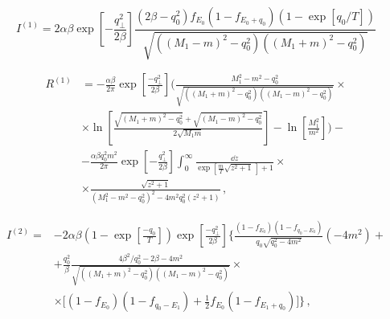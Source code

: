 \begin{equation}
I^{(1)}=2\alpha\beta\exp \left[-\frac{q_\perp^2}{2\beta }\right]\frac{\left(2\beta -q_0^2\right) f_{E_0}\left(1-f_{E_0+q_0}\right)\left(1-\exp[q_0/T]\right)}{ \sqrt{\left((M_1-m)^2-q_0^2\right) \left((M_1+m)^2-q_0^2\right)}}
\end{equation}

\begin{equation}\begin{aligned}
R^{(1)}&= -\frac{\alpha \beta}{2\pi}\exp\left[\frac{-q_\perp^2}{2\beta}\right]\bigg(\frac{M_1^2-m^2-q_0^2}{\sqrt{((M_1+m)^2-q_0^2)((M_1-m)^2-q_0^2)}}
\times
\\
&\times
\ln\left[\frac{\sqrt{(M_1+m)^2-q_0^2}+\sqrt{(M_1-m)^2-q_0^2}}{2\sqrt{M_1 m}}\right]-\ln\left[\frac{M_1^2}{m^2}\right]\bigg)
-
\\
&-\frac{\alpha \beta q_0^2 m^2}{2\pi} \exp\left[-\frac{q_\perp^2}{2\beta}\right]\int_{0}^{\infty}\frac{\dd z}{\exp \left[\frac{m}{T}\sqrt{z^2+1}\,\right]+1}\times
\\
&\times\frac{\sqrt{z^2+1}}{ \left(M_1^2-m^2-q_0^2\right)^2-4m^2q_0^2 \left(z^2+1\right)}\, ,
\end{aligned}
\end{equation}

\begin{equation}\begin{aligned}
I^{(2)}=&-2\alpha\beta\left(1-\exp\left[{\frac{-q_0}{T}}\right]\right)\exp\left[{\frac{-q^2_\perp}{2\beta}}\right] \bigg\{
\frac{(1-f_{E_{0}}) (1 - f_{q_0 - E_{0}})}{q_0\sqrt{q^{2}_{0}-4 m^2}}
\left (- 4 m^2 \right )+
\\
& 
+
\frac{q_0^2}{\beta}
\frac{4\beta^2/q^{2}_{0} - 2 \beta - 4 m^2}{\sqrt{((M_1+m)^2-q_0^2)((M_1-m)^2-q_0^2)}}\times
\\
&\times\bigg[(1-f_{E_{0}}) (1 - f_{q_0 - E_{1}})+
\frac{1}{2}f_{E_{0}} (1 - f_{E_{1} + q_0})
\bigg]
\bigg\}\, ,
\end{aligned}\end{equation}

